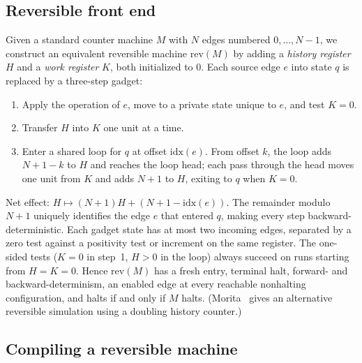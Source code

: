 \documentclass{article}
\theoremstyle{definition}
\theoremstyle{remark}
\begin{document}
\subsection{Reversible front end}

Given a standard counter machine $M$ with $N$ edges numbered $0, \ldots, N-1$, we construct an equivalent reversible machine $\mathrm{rev}(M)$ by adding a \emph{history register} $H$ and a \emph{work register} $K$, both initialized to $0$.
Each source edge $e$ into state $q$ is replaced by a three-step gadget:
\begin{enumerate}
\item Apply the operation of $e$, move to a private state unique to $e$, and test $K = 0$.
\item Transfer $H$ into $K$ one unit at a time.
\item Enter a shared loop for $q$ at offset $\mathrm{idx}(e)$. From offset $k$, the loop adds $N + 1 - k$ to $H$ and reaches the loop head; each pass through the head moves one unit from $K$ and adds $N + 1$ to $H$, exiting to $q$ when $K = 0$.
\end{enumerate}
Net effect: $H \mapsto (N+1)H + (N + 1 - \mathrm{idx}(e))$.
The remainder modulo $N+1$ uniquely identifies the edge $e$ that entered $q$, making every step backward-deterministic.
Each gadget state has at most two incoming edges, separated by a zero test against a positivity test or increment on the same register.
The one-sided tests ($K=0$ in step~1, $H>0$ in the loop) always succeed on runs starting from $H = K = 0$.
Hence $\mathrm{rev}(M)$ has a fresh entry, terminal halt, forward- and backward-determinism, an enabled edge at every reachable nonhalting configuration, and halts if and only if $M$ halts.
(Morita~\cite[Theorem~3.1]{Morita1996} gives an alternative reversible simulation using a doubling history counter.)

\subsection{Compiling a reversible machine}
\end{document}
